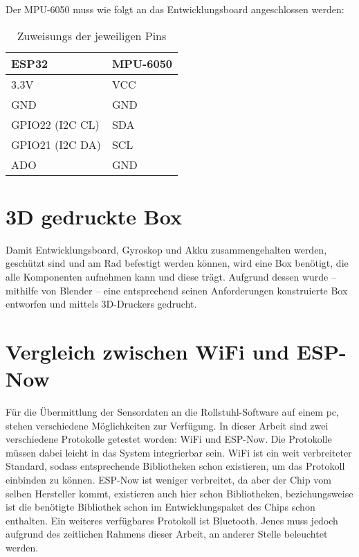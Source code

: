 Der MPU-6050 muss wie folgt an das Entwicklungsboard angeschlossen werden:

\begin{table}[h]
    \centering
    \begin{threeparttable}
        \caption{Zuweisungs der jeweiligen Pins}
        \begin{tabular}{|l|l|}
            \hline
            \textbf{ESP32}                          & \textbf{MPU-6050}           \\ \hline
            \parbox[c][0.5cm]{3cm}{3.3V}            & \parbox[c][0.5cm]{3cm}{VCC} \\ \hline
            \parbox[c][0.5cm]{3cm}{GND}             & \parbox[c][0.5cm]{3cm}{GND} \\ \hline
            \parbox[c][0.5cm]{3cm}{GPIO22 (I2C CL)} & \parbox[c][0.5cm]{3cm}{SDA} \\ \hline
            \parbox[c][0.5cm]{3cm}{GPIO21 (I2C DA)} & \parbox[c][0.5cm]{3cm}{SCL} \\ \hline
            \parbox[c][0.5cm]{3cm}{ADO}             & \parbox[c][0.5cm]{3cm}{GND} \\ \hline
        \end{tabular}
    \end{threeparttable}
\end{table}

\section{3D gedruckte Box}
Damit Entwicklungsboard, Gyroskop und Akku zusammengehalten werden, geschützt sind und am Rad befestigt werden können, wird eine Box benötigt, die alle Komponenten aufnehmen kann und diese trägt.
Aufgrund dessen wurde – mithilfe von Blender – eine entsprechend seinen Anforderungen konstruierte Box entworfen und mittels 3D-Druckers gedrucht.

\section{Vergleich zwischen WiFi und ESP-Now}
Für die Übermittlung der Sensordaten an die Rollstuhl-Software auf einem \ac{pc}, stehen verschiedene Möglichkeiten zur Verfügung.
In dieser Arbeit sind zwei verschiedene Protokolle getestet worden: WiFi und ESP-Now. Die Protokolle müssen dabei leicht in das System integrierbar sein.
WiFi ist ein weit verbreiteter Standard, sodass entsprechende Bibliotheken schon existieren, um das Protokoll einbinden zu können\cite{WiFiArduinoReference}.
ESP-Now ist weniger verbreitet, da aber der Chip vom selben Hersteller kommt, existieren auch hier schon Bibliotheken, beziehungsweise ist die benötigte Bibliothek schon im Entwicklungspaket des Chips schon enthalten\cite{EspressifIoTDevelopment2022}.
Ein weiteres verfügbares Protokoll ist Bluetooth.
Jenes muss jedoch aufgrund des zeitlichen Rahmens dieser Arbeit, an anderer Stelle beleuchtet werden.


